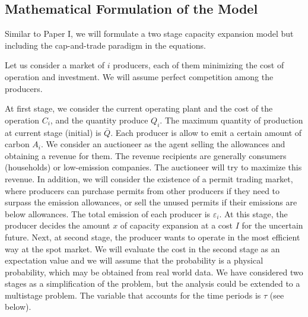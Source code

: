 \documentclass[11pt, letterpaper]{article}
\begin{document}
\subsection{Mathematical Formulation of the Model}\label{model}

Similar to Paper I, we will formulate a two stage capacity expansion model but including the cap-and-trade paradigm in the equations.

Let us consider a market of $i$ producers, each of them minimizing the cost of operation and investment. We will assume perfect competition among the producers. 

\smallskip

At first stage, we consider the current operating plant and the cost of the operation $C_i$, and the quantity produce $Q_i$. The maximum quantity of production at current stage (initial) is $\bar{Q}$. Each producer is allow to emit a certain amount of carbon $A_i$. We consider an auctioneer as the agent selling the allowances and obtaining a revenue for them. The revenue recipients are generally consumers (households) or low-emission companies. The auctioneer will try to maximize this revenue. In addition, we will consider the existence of a permit trading market, where producers can purchase permits from other producers if they need to surpass the emission allowances, or sell the unused permits if their emissions are below allowances. The total emission of each producer is $\varepsilon_i$. At this stage, the producer decides the amount $x$ of capacity expansion at a cost $I$ for the uncertain future. Next, at second stage, the producer wants to operate in the most efficient way at the spot market. We will evaluate the cost in the second stage as an expectation value and we will assume that the probability is a physical probability, which may be obtained from real world data. We have considered two stages as a simplification of the problem, but the analysis could be extended to a multistage problem. The variable that accounts for the time periods is $\tau$ (see below).
\smallskip
\end{document}
